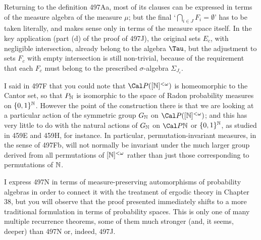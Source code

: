 {Returning to the definition 497Aa, most of its clauses
can be expressed in terms of the
measure algebra of the measure $\mu$;  but the final
`$\bigcap_{i\in J}F_i=\emptyset$' has to be taken literally, and makes
sense only in terms of the measure space itself.   In the key application
(part (d) of the proof of 497J), the original sets $E_c$, with negligible
intersection, already belong to the algebra $\Tau$, but the adjustment
to sets $F_c$ with empty intersection is still non-trivial, because of the
requirement that each $F_c$ must belong to the prescribed $\sigma$-algebra
$\Sigma_{J_c}$.

I said in 497F that you could note that $\Cal P([\Bbb N]^{<\omega})$ is
homeomorphic to the Cantor set, so that $P_{\Bbb N}$ is isomorphic
to the space of Radon probability measures on $\{0,1\}^{\Bbb N}$.
However the point of the construction there
is that we are looking at a particular action of the symmetric group
$G_{\Bbb N}$ on $\Cal P([\Bbb N]^{<\omega})$;  and this has very little
to do with the natural actions of $G_{\Bbb N}$ on $\Cal P\Bbb N$ or
$\{0,1\}^{\Bbb N}$, as studied in 459E and 459H, for instance.
In particular, permutation-invariant measures, in the
sense of 497Fb, will not normally be invariant under the much larger group
derived from all permutations of $[\Bbb N]^{<\omega}$ rather than
just those corresponding to permutations of $\Bbb N$.

I express 497N in terms of measure-preserving
automorphisms of probability algebras in order to connect it with the
treatment of ergodic theory in Chapter 38, but you will observe that the
proof presented
immediately shifts to a more traditional formulation in terms of
probability spaces.   This is only one of many
multiple recurrence theorems, some of them much
stronger (and, it seems, deeper) than 497N or, indeed, 497J.
}%

\discrpage
